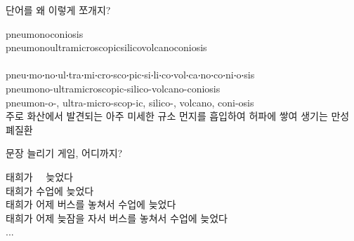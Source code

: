 \documentclass[11pt, aspectratio=169]{beamer}
\begin{document}
\begin{frame}[t]{}
  \begin{block}{단어를 왜 이렇게 쪼개지?}
    \begin{center}
      pneumonoconiosis\\
      pneumonoultramicroscopicsilicovolcanoconiosis\\
      \\
      {\small pneu‧mo‧no‧ul‧tra‧mi‧cro‧sco‧pic‧si‧li‧co‧vol‧ca‧no‧co‧ni‧o‧sis}\\
      pneumono-ultramicroscopic-silico-volcano-coniosis\\
      pneumon-o-, ultra-micro-scop-ic, silico-, volcano, coni-osis\\
      {\small 주로 화산에서 발견되는 아주 미세한 규소 먼지를 흡입하여 허파에 쌓여 생기는 만성 폐질환}      
    \end{center}
  \end{block}  
\end{frame}

\begin{frame}[t]{}
  \begin{block}{문장 늘리기 게임, 어디까지?}
    \begin{center}
      태희가 \,\,\,\, 늦었다 \\
      태희가 수업에 늦었다 \\
      태희가 어제 버스를 놓쳐서 수업에 늦었다 \\
      태희가 어제 늦잠을 자서 버스를 놓쳐서 수업에 늦었다 \\
      ...
    \end{center}
  \end{block}
\end{frame}
\end{document}
